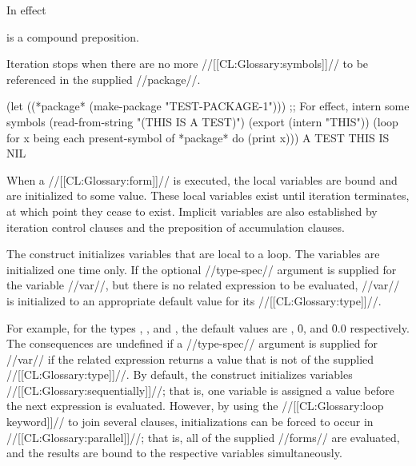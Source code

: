 In effect 
                                          

is a compound preposition.

Iteration stops when there are no more //[[CL:Glossary:symbols]]// to be referenced  in the supplied //package//.

 \code
 (let ((*package* (make-package "TEST-PACKAGE-1")))
   ;; For effect, intern some symbols
   (read-from-string "(THIS IS A TEST)")
   (export (intern "THIS"))
   (loop for x being each present-symbol of *package*
          do (print x))) \OUT A  \OUT TEST  \OUT THIS \OUT IS  \EV NIL \endcode

\endsubsubsubsubsection%

\endsubsubsubsection%

\endsubsubsection%

  When a  //[[CL:Glossary:form]]// is executed, the local variables are bound and are initialized to some value.  These local variables exist until  iteration terminates, at which point they cease to exist.   Implicit variables are also established by iteration control clauses and the  preposition of accumulation clauses.

The  construct initializes variables that are local to  a loop.  The variables are initialized one time only. If the optional //type-spec// argument is supplied for the variable  //var//, but there is no related expression to be evaluated, //var// is initialized to an appropriate default value for its //[[CL:Glossary:type]]//.

For example, for the types , ,  and , the default values are \nil, \f{0}, and \f{0.0} respectively. The consequences are undefined if a  //type-spec// argument is supplied for //var// if the related expression returns a value that is not of the supplied  //[[CL:Glossary:type]]//. By default, the  construct initializes variables //[[CL:Glossary:sequentially]]//; that is, one variable is assigned a value before the next expression is evaluated.  However, by using the //[[CL:Glossary:loop keyword]]//  to join several  clauses,  initializations can be forced to occur in //[[CL:Glossary:parallel]]//; that  is, all of the supplied //forms// are evaluated, and the results are bound to the respective variables simultaneously.

